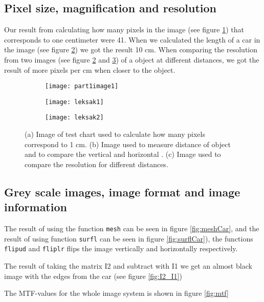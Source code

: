 \subsection{Pixel size, magnification and resolution}
Our result from calculating how many pixels in the image (see figure \ref{fig:TestChart}) that corresponds to one centimeter were 41. When we calculated the length of a car in the image (see figure \ref{fig:Toy1}) we got the result 10 cm. When comparing the resolution from two images (see figure \ref{fig:Toy1} and \ref{fig:Toy2}) of a object at different distances, we got the result of more pixels per cm when closer to the object.

\begin{figure}[h]
	\centering
	\begin{subfigure}[b]{0.3\textwidth}
		\texttt{[image: part1image1]}
		\caption{}
		\label{fig:TestChart}
	\end{subfigure}
	\begin{subfigure}[b]{0.3\textwidth}
		\texttt{[image: leksak1]}
		\caption{}
		\label{fig:Toy1}
	\end{subfigure}
	\begin{subfigure}[b]{0.3\textwidth}
		\texttt{[image: leksak2]}
		\caption{}
		\label{fig:Toy2}
	\end{subfigure}
	\caption{(a) Image of test chart used to calculate how many pixels correspond to 1 cm. (b) Image used to measure distance of object and to compare the vertical and horizontal . (c) Image used to compare the resolution for different distances.}
	\label{fig:part1}
\end{figure}

\subsection{Grey scale images, image format and image information}
The result of using the function \texttt{mesh} can be seen in figure \ref{fig:meshCar}, and the result of using function \texttt{surfl} can be seen in figure \ref{fig:surflCar}), the functions \texttt{flipud} and \texttt{fliplr} flips the image vertically and horizontally respectively. 

The result of taking the matrix I2 and subtract with I1 we get an almost black image with the edges from the car (see figure \ref{fig:I2_I1})

The MTF-values for the whole image system is shown in figure \ref{fig:mtf}


